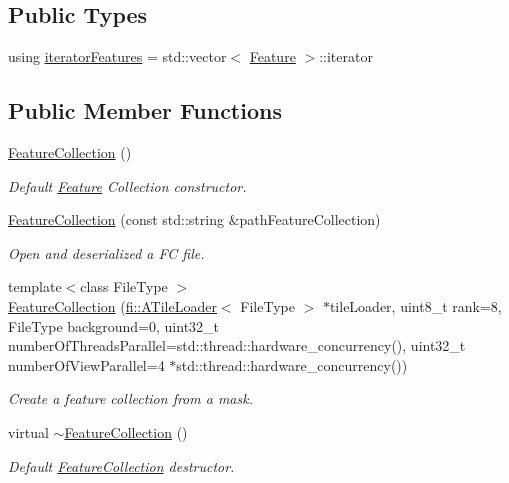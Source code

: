 \subsection*{Public Types}
\begin{DoxyCompactItemize}
\item 
using \hyperlink{classfc_1_1FeatureCollection_a947efbbe893a14c47d2d5e535a0e9429}{iterator\+Features} = std\+::vector$<$ \hyperlink{classfc_1_1Feature}{Feature} $>$\+::iterator
\end{DoxyCompactItemize}
\subsection*{Public Member Functions}
\begin{DoxyCompactItemize}
\item 
\hyperlink{classfc_1_1FeatureCollection_ab2e7399b460e0c12fc12cd289a1c14ed}{Feature\+Collection} ()
\begin{DoxyCompactList}\small\item\em Default \hyperlink{classfc_1_1Feature}{Feature} Collection constructor. \end{DoxyCompactList}\item 
\hyperlink{classfc_1_1FeatureCollection_aa5d92c395512b9dd5d6c240fa150f992}{Feature\+Collection} (const std\+::string \&path\+Feature\+Collection)
\begin{DoxyCompactList}\small\item\em Open and deserialized a FC file. \end{DoxyCompactList}\item 
{\footnotesize template$<$class File\+Type $>$ }\\\hyperlink{classfc_1_1FeatureCollection_acc38a1542fc4dc04175961140677ac51}{Feature\+Collection} (\hyperlink{classfi_1_1ATileLoader}{fi\+::\+A\+Tile\+Loader}$<$ File\+Type $>$ $\ast$tile\+Loader, uint8\+\_\+t rank=8, File\+Type background=0, uint32\+\_\+t number\+Of\+Threads\+Parallel=std\+::thread\+::hardware\+\_\+concurrency(), uint32\+\_\+t number\+Of\+View\+Parallel=4 $\ast$std\+::thread\+::hardware\+\_\+concurrency())
\begin{DoxyCompactList}\small\item\em Create a feature collection from a mask. \end{DoxyCompactList}\item 
virtual \hyperlink{classfc_1_1FeatureCollection_abd2b7140fdf0ccd6cee9234ad932c973}{$\sim$\+Feature\+Collection} ()
\begin{DoxyCompactList}\small\item\em Default \hyperlink{classfc_1_1FeatureCollection}{Feature\+Collection} destructor. \end{DoxyCompactList}\item 

\end{DoxyCompactItemize}

